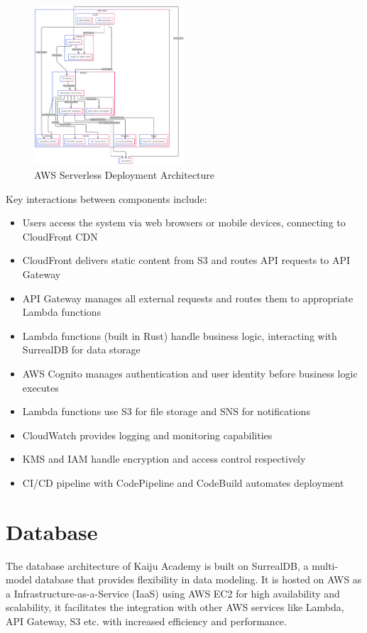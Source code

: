 \documentclass[a4paper, 11pt]{scrreprt}
\begin{document}
\begin{figure}[!htb]
    \centering
    \includegraphics[width=0.5\textwidth]{serverless_deployment.png}
    \caption{AWS Serverless Deployment Architecture}
\end{figure}

Key interactions between components include:
\begin{itemize}
    \item Users access the system via web browsers or mobile devices, connecting to CloudFront CDN
    \item CloudFront delivers static content from S3 and routes API requests to API Gateway
    \item API Gateway manages all external requests and routes them to appropriate Lambda functions
    \item Lambda functions (built in Rust) handle business logic, interacting with SurrealDB for data storage
    \item AWS Cognito manages authentication and user identity before business logic executes
    \item Lambda functions use S3 for file storage and SNS for notifications
    \item CloudWatch provides logging and monitoring capabilities
    \item KMS and IAM handle encryption and access control respectively
    \item CI/CD pipeline with CodePipeline and CodeBuild automates deployment
\end{itemize}

\section{Database}
The database architecture of Kaiju Academy is built on SurrealDB, a multi-model database that provides flexibility in data modeling.
It is hosted on AWS as a Infrastructure-as-a-Service (IaaS) using AWS EC2 for high availability and scalability, it facilitates the integration with other AWS services like Lambda, API Gateway, S3 etc. with
increased efficiency and performance.
\end{document}

